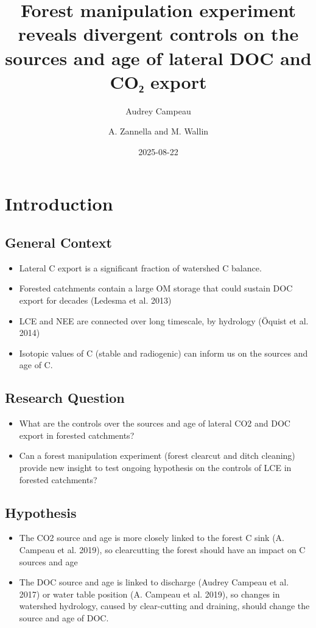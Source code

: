 \documentclass[
]{article}
\title{Forest manipulation experiment reveals divergent controls on the
sources and age of lateral DOC and CO₂ export}
\author{Audrey Campeau \and A. Zannella and M. Wallin}
\date{2025-08-22}
\renewcommand*\contentsname{Table of contents}
\newcommand\contentsname{Table of contents}
\begin{document}
\maketitle

\renewcommand*\contentsname{Table of contents}
{
\hypersetup{linkcolor=}
\setcounter{tocdepth}{2}
\tableofcontents
}

\section{Introduction}\label{introduction}

\subsection{General Context}\label{general-context}

\begin{itemize}
\item
  Lateral C export is a significant fraction of watershed C balance.
\item
  Forested catchments contain a large OM storage that could sustain DOC
  export for decades (Ledesma et al. 2013)
\item
  LCE and NEE are connected over long timescale, by hydrology (Öquist et
  al. 2014)
\item
  Isotopic values of C (stable and radiogenic) can inform us on the
  sources and age of C.
\end{itemize}

\subsection{Research Question}\label{research-question}

\begin{itemize}
\item
  What are the controls over the sources and age of lateral CO2 and DOC
  export in forested catchments?
\item
  Can a forest manipulation experiment (forest clearcut and ditch
  cleaning) provide new insight to test ongoing hypothesis on the
  controls of LCE in forested catchments?
\end{itemize}

\subsection{Hypothesis}\label{hypothesis}

\begin{itemize}
\item
  The CO2 source and age is more closely linked to the forest C sink (A.
  Campeau et al. 2019), so clearcutting the forest should have an impact
  on C sources and age
\item
  The DOC source and age is linked to discharge (Audrey Campeau et al.
  2017) or water table position (A. Campeau et al. 2019), so changes in
  watershed hydrology, caused by clear-cutting and draining, should
  change the source and age of DOC.
\end{itemize}
\end{document}
